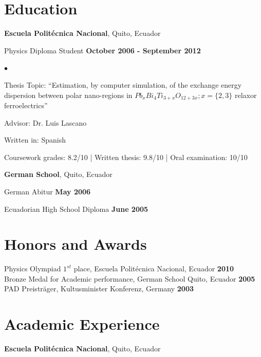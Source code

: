 \documentclass[margin,line]{res}
\newenvironment{list1}{
  \begin{list}{\ding{113}}{%
      \setlength{\itemsep}{0in}
      \setlength{\parsep}{0in} \setlength{\parskip}{0in}
      \setlength{\topsep}{0in} \setlength{\partopsep}{0in} 
      \setlength{\leftmargin}{0.17in}}}{\end{list}}
\newenvironment{list2}{
  \begin{list}{$\bullet$}{%
      \setlength{\itemsep}{0in}
      \setlength{\parsep}{0in} \setlength{\parskip}{0in}
      \setlength{\topsep}{0in} \setlength{\partopsep}{0in} 
      \setlength{\leftmargin}{0.2in}}}{\end{list}}
\begin{document}
\begin{resume}
\section{\sc Education}
  {\bf Escuela Politécnica Nacional}, Quito, Ecuador\\
  \vspace{-.1in}
  \begin{list1}
    \item[] Physics Diploma Student \hfill {\bf October 2006 - September 2012}\\
    \begin{list2}
    \vspace{-.1in}
      \item Thesis Topic:  ``Estimation, by computer simulation, of the exchange
	energy dispersion between polar nano-regions in $Pb_xBi_4Ti_{3+x}O_{12+3x}; x=\{2,3\}$
	relaxor ferroelectrics''
      \item Advisor: Dr. Luis Lascano
      \item Written in: Spanish
      \item Coursework grades: 8.2/10 | Written thesis: 9.8/10 | Oral examination: 10/10
    \end{list2}
  \end{list1}

  {\bf German School}, Quito, Ecuador\\
  \vspace{-.1in}
  \begin{list1}
    \item[] German Abitur \hfill {\bf May 2006}
    \item[] Ecuadorian High School Diploma \hfill {\bf June 2005}
  \end{list1}

\section{\sc Honors and Awards}
  Physics Olympiad $1^{st}$ place, Escuela Politécnica Nacional, Ecuador \hfill {\bf 2010}\\
  Bronze Medal for Academic performance, German School Quito, Ecuador \hfill {\bf 2005}\\
  PAD Preisträger, Kultusminister Konferenz, Germany \hfill {\bf 2003}

\section{\sc Academic Experience}
  {\bf Escuela Politécnica Nacional}, Quito, Ecuador
    \vspace{-.3cm}


\end{resume}
\end{document}
